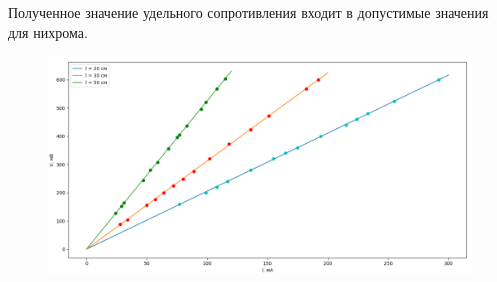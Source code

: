 \documentclass[a4paper, 12pt]{article}
\begin{document}
		Полученное значение удельного сопротивления входит в допустимые значения для нихрома.
		\begin{figure}[h!]
			\includegraphics[width=\linewidth]{pict1}
		\end{figure}
\end{document}
